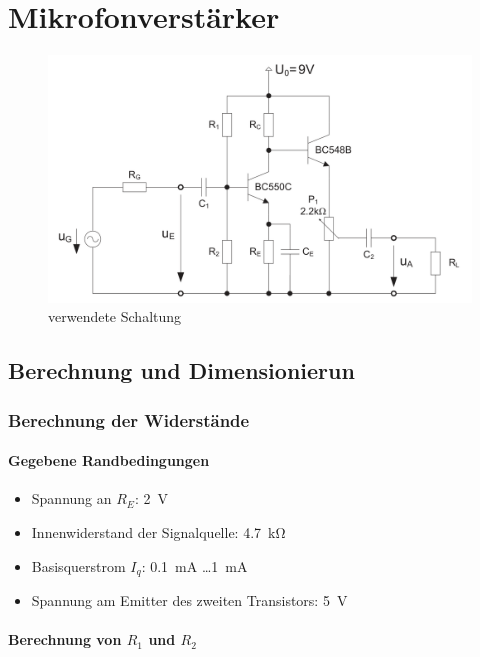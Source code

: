 \chapter{Mikrofonverstärker}

\begin{figure}[H]
    \centering
    \includegraphics[width = \textwidth]{tex/1_Microphone/pictures/Schaltung.png}
    \caption{verwendete Schaltung}
\end{figure}

\section{Berechnung und Dimensionierun}
\subsection{Berechnung der Widerstände}
\subsubsection{Gegebene Randbedingungen}

\begin{itemize}
    \item Spannung an $R_E$: \SI{2}{\volt}
    \item Innenwiderstand der Signalquelle: \SI{4.7}{\kilo \ohm}
    \item Basisquerstrom $I_q$: \SI{0.1}{\milli \ampere} \ldots \SI{1}{\milli \ampere}
    \item Spannung am Emitter des zweiten Transistors: \SI{5}{\volt}
\end{itemize}

\subsubsection{Berechnung von $R_1$ und $R_2$}

